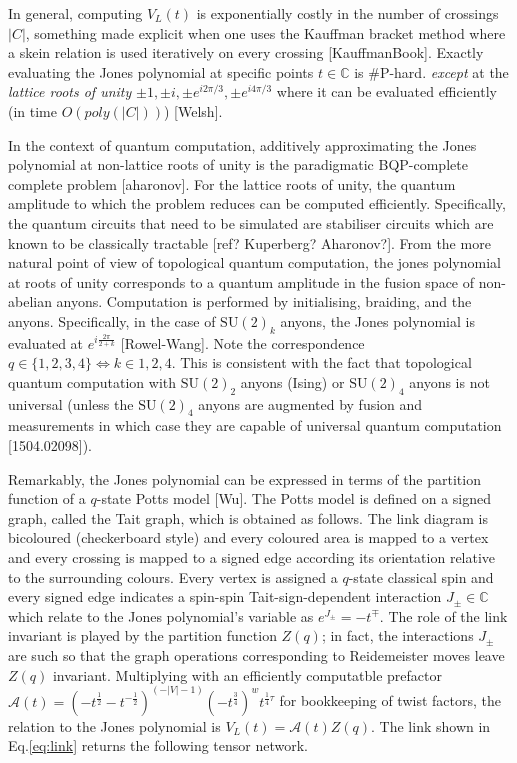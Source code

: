 \documentclass[submission,copyright,creativecommons]{eptcs}
\begin{document}
In general, computing $V_L(t)$
is exponentially costly in the number of crossings $|C|$,
something made explicit when one uses the Kauffman bracket method where a skein relation is used iteratively on every crossing [KauffmanBook].
Exactly evaluating the Jones polynomial at specific points $t\in\mathbb{C}$ is \#P-hard.
\emph{except} at the \emph{lattice roots of unity} $\pm 1, \pm i, \pm e^{i 2\pi/3}, \pm e^{i 4\pi/3}$ where it can be evaluated efficiently (in time $O(poly(|C|))$) [Welsh].


In the context of quantum computation,
additively approximating the Jones polynomial at non-lattice roots of unity is the paradigmatic BQP-complete complete problem [aharonov].
For the lattice roots of unity, the quantum amplitude to which the problem reduces can be computed efficiently.
Specifically, the quantum circuits that need to be simulated are stabiliser circuits which are known to be classically tractable [ref? Kuperberg? Aharonov?].
From the more natural point of view of topological quantum computation,
the jones polynomial at roots of unity corresponds to a quantum amplitude in the fusion space of non-abelian anyons.
Computation is performed by initialising, braiding, and the anyons.
Specifically, in the case of $\text{SU}(2)_k$ anyons, the Jones polynomial is evaluated at $e^{i\frac{2\pi}{2+k}}$ [Rowel-Wang]. Note the correspondence $q\in\{1,2,3,4\}\Leftrightarrow k\in{1,2,4}$.
This is consistent with the fact that topological quantum computation with $\text{SU}(2)_2$ anyons (Ising) or $\text{SU}(2)_4$ anyons is not universal (unless the $\text{SU}(2)_4$ anyons are augmented by fusion and measurements in which case they are capable of universal quantum computation [1504.02098]).



Remarkably, the Jones polynomial can be expressed in terms of the partition function of a $q$-state Potts model [Wu].
The Potts model is defined on a signed graph, called the Tait graph, which is obtained as follows.
The link diagram is bicoloured (checkerboard style)
and every coloured area is mapped to a vertex and every crossing is mapped to a signed edge according
its orientation relative to the surrounding colours.
Every vertex is assigned a $q$-state classical spin
and every signed edge indicates a spin-spin Tait-sign-dependent interaction $J_\pm\in\mathbb{C}$ which relate to the Jones polynomial's variable as $e^{J_\pm}=-t^\mp$.
The role of the link invariant is played by the partition function $Z(q)$;
in fact, the interactions $J_\pm$ are such so that the graph operations corresponding to Reidemeister moves leave $Z(q)$ invariant.
Multiplying with an efficiently computatble prefactor $\mathcal{A}(t) = (-t^\frac{1}{2}-t^{-\frac{1}{2}})^{(-|V|-1)} (-t^\frac{3}{4})^w t^{\frac{1}{4}\tau}$ for bookkeeping of twist factors, the relation to the Jones polynomial is
$V_L(t) = \mathcal{A}(t) Z(q)$.
The link shown in Eq.\ref{eq:link} returns the following tensor network.
\end{document}
